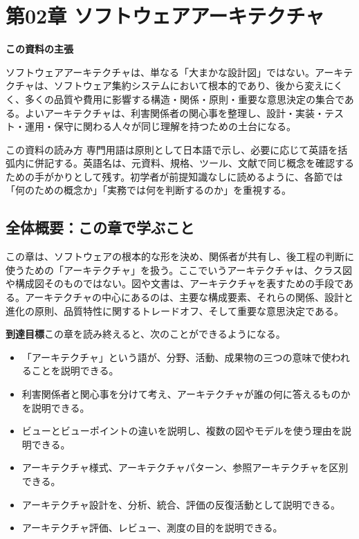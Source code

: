 \section{第02章 ソフトウェアアーキテクチャ}
\noindent\textbf{この資料の主張}\par
ソフトウェアアーキテクチャは、単なる「大まかな設計図」ではない。アーキテクチャは、ソフトウェア集約システムにおいて根本的であり、後から変えにくく、多くの品質や費用に影響する構造・関係・原則・重要な意思決定の集合である。よいアーキテクチャは、利害関係者の関心事を整理し、設計・実装・テスト・運用・保守に関わる人々が同じ理解を持つための土台になる。

\begin{statementbox}{この資料の読み方}
専門用語は原則として日本語で示し、必要に応じて英語を括弧内に併記する。英語名は、元資料、規格、ツール、文献で同じ概念を確認するための手がかりとして残す。初学者が前提知識なしに読めるように、各節では「何のための概念か」「実務では何を判断するのか」を重視する。
\end{statementbox}

\subsection*{全体概要：この章で学ぶこと}
この章は、ソフトウェアの根本的な形を決め、関係者が共有し、後工程の判断に使うための「アーキテクチャ」を扱う。ここでいうアーキテクチャは、クラス図や構成図そのものではない。図や文書は、アーキテクチャを表すための手段である。アーキテクチャの中心にあるのは、主要な構成要素、それらの関係、設計と進化の原則、品質特性に関するトレードオフ、そして重要な意思決定である。

\noindent\textbf{到達目標}\quad この章を読み終えると、次のことができるようになる。
\begin{itemize}
  \item 「アーキテクチャ」という語が、分野、活動、成果物の三つの意味で使われることを説明できる。
  \item 利害関係者と関心事を分けて考え、アーキテクチャが誰の何に答えるものかを説明できる。
  \item ビューとビューポイントの違いを説明し、複数の図やモデルを使う理由を説明できる。
  \item アーキテクチャ様式、アーキテクチャパターン、参照アーキテクチャを区別できる。
  \item アーキテクチャ設計を、分析、統合、評価の反復活動として説明できる。
  \item アーキテクチャ評価、レビュー、測度の目的を説明できる。
\end{itemize}

